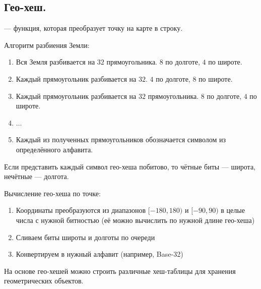 \subsection{Гео-хеш.}
\begin{definition}
   --- функция, которая преобразует точку на карте в строку. 
\end{definition}

Алгоритм разбиения Земли:
\begin{enumerate}
  \item Вся Земля разбивается на $32$ прямоугольника. $8$ по долготе, $4$ по широте.
  \item Каждый прямоугольник разбивается на $32$. $4$ по долготе, $8$ по широте.
  \item Каждый прямоугольник разбивается на $32$ прямоугольника. $8$ по долготе, $4$ по широте.
  \item $\ldots$
  \item Каждый из полученных прямоугольников обозначается символом из определённого алфавита.
\end{enumerate}

\begin{remark}
  Если представить каждый символ гео-хеша побитово, то чётные биты --- широта, нечётные --- долгота.
\end{remark}

Вычисление гео-хеша по точке:
\begin{enumerate}
  \item Координаты преобразуются из диапазонов $[-180, 180)$ и  $[-90, 90)$ в целые числа с нужной битностью
    (её можно вычислить по нужной длине гео-хеша)
  \item Сливаем биты широты и долготы по очереди
  \item Конвертируем в нужный алфавит (например, Base-32)
\end{enumerate}

\begin{remark}
  На основе гео-хешей можно строить различные хеш-таблицы для хранения геометрических объектов.
\end{remark}

